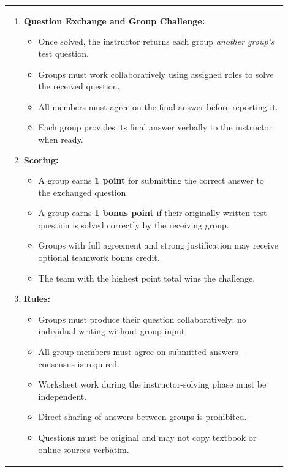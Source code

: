 \documentclass{article}
\begin{document}
\newpage
\begin{tabular}{|p{0.9\linewidth}|}
\hline
\begin{enumerate}
    \item \textbf{Question Exchange and Group Challenge:}
    \begin{itemize}
        \item Once solved, the instructor returns each group \emph{another group’s} test question.
        \item Groups must work collaboratively using assigned roles to solve the received question.
        \item All members must agree on the final answer before reporting it.
        \item Each group provides its final answer verbally to the instructor when ready.
    \end{itemize}

    \item \textbf{Scoring:}
    \begin{itemize}
        \item A group earns \textbf{1 point} for submitting the correct answer to the exchanged question.
        \item A group earns \textbf{1 bonus point} if their originally written test question is solved correctly by the receiving group.
        \item Groups with full agreement and strong justification may receive optional teamwork bonus credit.
        \item The team with the highest point total wins the challenge.
    \end{itemize}

    \item \textbf{Rules:}
    \begin{itemize}
        \item Groups must produce their question collaboratively; no individual writing without group input.
        \item All group members must agree on submitted answers—consensus is required.
        \item Worksheet work during the instructor-solving phase must be independent.
        \item Direct sharing of answers between groups is prohibited.
        \item Questions must be original and may not copy textbook or online sources verbatim.
    \end{itemize}


\end{enumerate}
\end{tabular}
\end{document}
